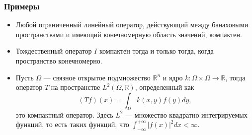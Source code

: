 \subsubsection*{Примеры}
\begin{itemize}
	\itemsep0pt
	\item Любой ограниченный линейный оператор, действующий между банаховыми пространствами и имеющий конечномерную область значений, компактен.
	\item Тождественный оператор $I$ компактен тогда и только тогда, когда пространство конечномерно.
	\item Пусть $\Omega$ --- связное открытое подмножество $\mathbb{R}^n$ и ядро $k : \Omega \times \Omega \rightarrow \mathbb{R}$, тогда оператор $T$ на пространстве $L^2(\Omega, \mathbb{R})$, определенный как
	$$ (Tf)(x) = \int_{\Omega} k(x, y)f(y)dy,$$
	это компактный оператор. Здесь $L^2$ --- множество квадратно интегрируемых функций, то есть таких функций, что $\displaystyle \int_{-\infty}^{+\infty}|f(x)|^2 dx < \infty$.
\end{itemize}